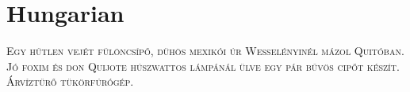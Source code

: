 

\presection\section*{\checkyes Hungarian}\postsection

\textsc{
Egy hűtlen vejét fülöncsípő, dühös mexikói úr Wesselényinél mázol Quitóban.
Jó foxim és don Quijote húszwattos lámpánál ülve egy pár bűvös cipőt készít.
Árvíztűrő tükörfúrógép.}